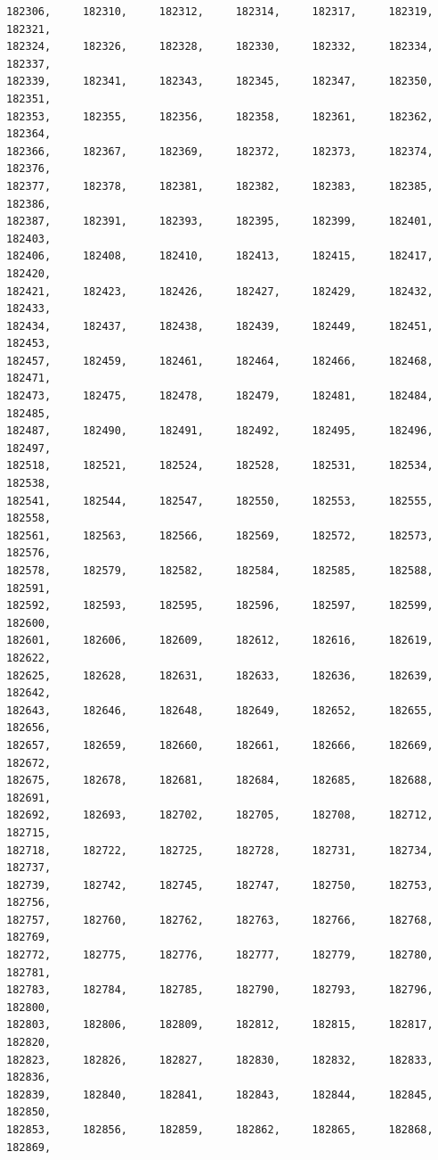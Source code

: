 \documentclass[a4paper,11pt]{report}
\begin{document}
\begin{verbatim}
182306,     182310,     182312,     182314,     182317,     182319,     182321,
182324,     182326,     182328,     182330,     182332,     182334,     182337,
182339,     182341,     182343,     182345,     182347,     182350,     182351,
182353,     182355,     182356,     182358,     182361,     182362,     182364,
182366,     182367,     182369,     182372,     182373,     182374,     182376,
182377,     182378,     182381,     182382,     182383,     182385,     182386,
182387,     182391,     182393,     182395,     182399,     182401,     182403,
182406,     182408,     182410,     182413,     182415,     182417,     182420,
182421,     182423,     182426,     182427,     182429,     182432,     182433,
182434,     182437,     182438,     182439,     182449,     182451,     182453,
182457,     182459,     182461,     182464,     182466,     182468,     182471,
182473,     182475,     182478,     182479,     182481,     182484,     182485,
182487,     182490,     182491,     182492,     182495,     182496,     182497,
182518,     182521,     182524,     182528,     182531,     182534,     182538,
182541,     182544,     182547,     182550,     182553,     182555,     182558,
182561,     182563,     182566,     182569,     182572,     182573,     182576,
182578,     182579,     182582,     182584,     182585,     182588,     182591,
182592,     182593,     182595,     182596,     182597,     182599,     182600,
182601,     182606,     182609,     182612,     182616,     182619,     182622,
182625,     182628,     182631,     182633,     182636,     182639,     182642,
182643,     182646,     182648,     182649,     182652,     182655,     182656,
182657,     182659,     182660,     182661,     182666,     182669,     182672,
182675,     182678,     182681,     182684,     182685,     182688,     182691,
182692,     182693,     182702,     182705,     182708,     182712,     182715,
182718,     182722,     182725,     182728,     182731,     182734,     182737,
182739,     182742,     182745,     182747,     182750,     182753,     182756,
182757,     182760,     182762,     182763,     182766,     182768,     182769,
182772,     182775,     182776,     182777,     182779,     182780,     182781,
182783,     182784,     182785,     182790,     182793,     182796,     182800,
182803,     182806,     182809,     182812,     182815,     182817,     182820,
182823,     182826,     182827,     182830,     182832,     182833,     182836,
182839,     182840,     182841,     182843,     182844,     182845,     182850,
182853,     182856,     182859,     182862,     182865,     182868,     182869,

\end{verbatim}
\end{document}
